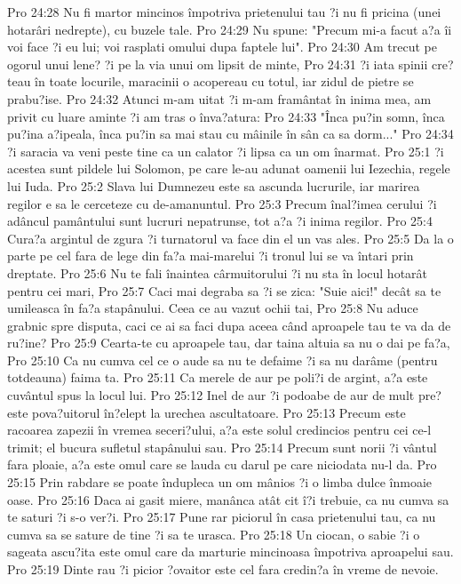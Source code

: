 Pro 24:28  Nu fi martor mincinos împotriva prietenului tau ?i nu fi pricina (unei hotarâri nedrepte), cu buzele tale.
Pro 24:29  Nu spune: "Precum mi-a facut a?a îi voi face ?i eu lui; voi rasplati omului dupa faptele lui".
Pro 24:30  Am trecut pe ogorul unui lene? ?i pe la via unui om lipsit de minte,
Pro 24:31  ?i iata spinii cre?teau în toate locurile, maracinii o acopereau cu totul, iar zidul de pietre se prabu?ise.
Pro 24:32  Atunci m-am uitat ?i m-am framântat în inima mea, am privit cu luare aminte ?i am tras o înva?atura:
Pro 24:33  "Înca pu?in somn, înca pu?ina a?ipeala, înca pu?in sa mai stau cu mâinile în sân ca sa dorm..."
Pro 24:34  ?i saracia va veni peste tine ca un calator ?i lipsa ca un om înarmat.
Pro 25:1  ?i acestea sunt pildele lui Solomon, pe care le-au adunat oamenii lui Iezechia, regele lui Iuda.
Pro 25:2  Slava lui Dumnezeu este sa ascunda lucrurile, iar marirea regilor e sa le cerceteze cu de-amanuntul.
Pro 25:3  Precum înal?imea cerului ?i adâncul pamântului sunt lucruri nepatrunse, tot a?a ?i inima regilor.
Pro 25:4  Cura?a argintul de zgura ?i turnatorul va face din el un vas ales.
Pro 25:5  Da la o parte pe cel fara de lege din fa?a mai-marelui ?i tronul lui se va întari prin dreptate.
Pro 25:6  Nu te fali înaintea cârmuitorului ?i nu sta în locul hotarât pentru cei mari,
Pro 25:7  Caci mai degraba sa ?i se zica: "Suie aici!" decât sa te umileasca în fa?a stapânului. Ceea ce au vazut ochii tai,
Pro 25:8  Nu aduce grabnic spre disputa, caci ce ai sa faci dupa aceea când aproapele tau te va da de ru?ine?
Pro 25:9  Cearta-te cu aproapele tau, dar taina altuia sa nu o dai pe fa?a,
Pro 25:10  Ca nu cumva cel ce o aude sa nu te defaime ?i sa nu darâme (pentru totdeauna) faima ta.
Pro 25:11  Ca merele de aur pe poli?i de argint, a?a este cuvântul spus la locul lui.
Pro 25:12  Inel de aur ?i podoabe de aur de mult pre? este pova?uitorul în?elept la urechea ascultatoare.
Pro 25:13  Precum este racoarea zapezii în vremea seceri?ului, a?a este solul credincios pentru cei ce-l trimit; el bucura sufletul stapânului sau.
Pro 25:14  Precum sunt norii ?i vântul fara ploaie, a?a este omul care se lauda cu darul pe care niciodata nu-l da.
Pro 25:15  Prin rabdare se poate îndupleca un om mânios ?i o limba dulce înmoaie oase.
Pro 25:16  Daca ai gasit miere, manânca atât cit î?i trebuie, ca nu cumva sa te saturi ?i s-o ver?i.
Pro 25:17  Pune rar piciorul în casa prietenului tau, ca nu cumva sa se sature de tine ?i sa te urasca.
Pro 25:18  Un ciocan, o sabie ?i o sageata ascu?ita este omul care da marturie mincinoasa împotriva aproapelui sau.
Pro 25:19  Dinte rau ?i picior ?ovaitor este cel fara credin?a în vreme de nevoie.
